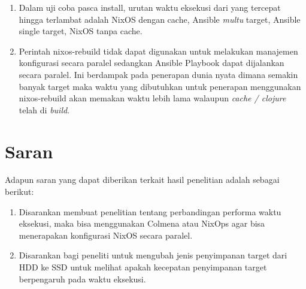 \documentclass[10pt,]{report}
\begin{document}
\begin{adjustwidth}{20pt}{}
\begin{enumerate}[label=\arabic*.]
		      \begin{enumerate}[label=\alph*.]
			      \item Dalam uji coba pasca install, urutan waktu eksekusi dari yang tercepat
			            hingga terlambat adalah NixOS dengan cache, Ansible \textit{multu} target,
			            Ansible single target, NixOS tanpa cache.
			      \item Perintah nixos-rebuild tidak dapat digunakan untuk melakukan manajemen
			            konfigurasi secara paralel sedangkan Ansible Playbook dapat dijalankan secara
			            paralel. Ini berdampak pada penerapan dunia nyata dimana semakin banyak
			            target maka waktu yang dibutuhkan untuk penerapan menggunakan nixos-rebuild
			            akan memakan waktu lebih lama walaupun \textit{cache / clojure} telah di
			            \textit{build}.
		      \end{enumerate}
	\end{enumerate}
\end{adjustwidth}
\section{Saran}
\begin{adjustwidth}{20pt}{}
	\hspace\parindent
	Adapun saran yang dapat diberikan terkait hasil penelitian adalah sebagai berikut:
	\begin{enumerate}
		\item Disarankan membuat penelitian tentang perbandingan performa waktu eksekusi,
		      maka bisa menggunakan Colmena atau NixOps agar bisa menerapakan konfigurasi NixOS
		      secara paralel.
		\item Disarankan bagi peneliti untuk mengubah jenis penyimpanan target dari HDD
		      ke SSD untuk melihat apakah kecepatan penyimpanan target berpengaruh pada waktu
		      eksekusi.
	\end{enumerate}
\end{adjustwidth}
\printbibliography[title={DAFTAR PUSTAKA}]
\end{document}
